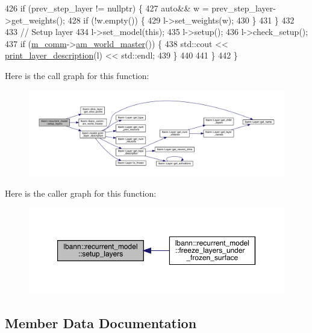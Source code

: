 \begin{DoxyCode}
426     \textcolor{keywordflow}{if} (prev\_step\_layer != \textcolor{keyword}{nullptr}) \{
427       \textcolor{keyword}{auto}&& w = prev\_step\_layer->get\_weights();
428       \textcolor{keywordflow}{if} (!w.empty()) \{
429         l->set\_weights(w);
430       \}
431     \}
432 
433     \textcolor{comment}{// Setup layer}
434     l->set\_model(\textcolor{keyword}{this});
435     l->setup();
436     l->check\_setup();
437     \textcolor{keywordflow}{if} (\hyperlink{classlbann_1_1model_a0eabaf2b2f829fd5db3dfd26df420df0}{m\_comm}->\hyperlink{classlbann_1_1lbann__comm_a1ef526486183a29feadca9bef096a534}{am\_world\_master}()) \{
438       std::cout << \hyperlink{classlbann_1_1model_ab173fd93a80a2980059ff292c308cbf5}{print\_layer\_description}(l) << std::endl;
439     \}
440 
441   \}
442 \}
\end{DoxyCode}
Here is the call graph for this function\+:\nopagebreak
\begin{figure}[H]
\begin{center}
\leavevmode
\includegraphics[width=350pt]{classlbann_1_1recurrent__model_a712dabb1c1e90f6e268b42f6abaedd93_cgraph}
\end{center}
\end{figure}
Here is the caller graph for this function\+:\nopagebreak
\begin{figure}[H]
\begin{center}
\leavevmode
\includegraphics[width=350pt]{classlbann_1_1recurrent__model_a712dabb1c1e90f6e268b42f6abaedd93_icgraph}
\end{center}
\end{figure}


\subsection{Member Data Documentation}
\mbox{\label{classlbann_1_1recurrent__model_a426829f7fa36b112b4b91393c1657ddd}} 
